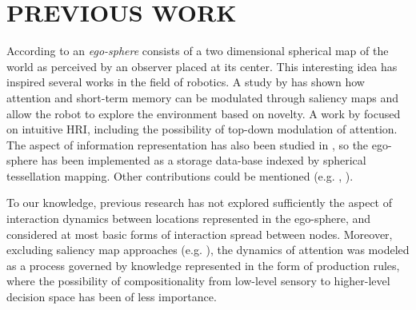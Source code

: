 \documentclass[letterpaper, 10 pt, conference]{ieeeconf}  %
\begin{document}
	
	
	\section{PREVIOUS WORK}
	\label{sec:previous}
	

	According to \cite{albus1991} an \textit{ego-sphere} consists of a two dimensional spherical map of the world as perceived by an observer placed at its center. This interesting idea has inspired several works in the field of robotics. A study by \cite{ruesch2008} has shown how attention and short-term memory can be modulated through saliency maps and allow the robot to explore the environment based on novelty. A work by \cite{bodiroza2011} focused on intuitive HRI, including the possibility of top-down modulation of attention. The aspect of information representation has also been studied in \cite{peters2009sensory}, so the ego-sphere has been implemented as a storage data-base indexed by spherical tessellation mapping. Other contributions could be mentioned (e.g. \cite{grotz2017}, \cite{marques2022}).%
	
	
	To our knowledge, previous research has not explored sufficiently the aspect of interaction dynamics between locations represented in the ego-sphere, and considered at most basic forms of interaction spread between nodes. Moreover, excluding saliency map approaches (e.g. \cite{ruesch2008}), the dynamics of attention was modeled as a process governed by knowledge represented in the form of production rules, where the possibility of compositionality from low-level sensory to higher-level decision space has been of less importance. 
	 
	
	
\end{document}
